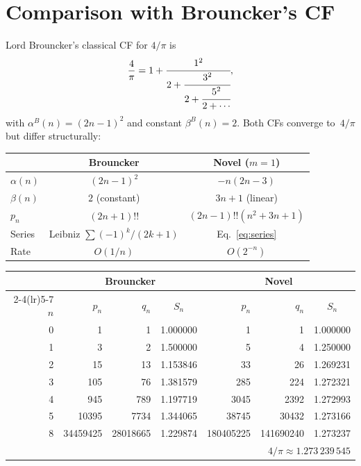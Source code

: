 \documentclass[11pt,a4paper]{article}
\theoremstyle{plain}
\theoremstyle{definition}
\theoremstyle{remark}
\newcommand{\dff}[1]{(#1)!!}
\begin{document}
\section{Comparison with Brouncker's CF}\label{sec:brouncker}

Lord Brouncker's classical CF for $4/\pi$ is
\[
  \frac{4}{\pi}
  = 1 + \cfrac{1^2}{2 + \cfrac{3^2}{2 + \cfrac{5^2}{2 + \cdots}}},
\]
with $\alpha^B(n) = (2n{-}1)^2$ and constant $\beta^B(n) = 2$.
Both CFs converge to~$4/\pi$ but differ structurally:

\begin{center}
\begin{tabular}{@{}lcc@{}}
  \toprule
  & \textbf{Brouncker} & \textbf{Novel ($m{=}1$)} \\
  \midrule
  $\alpha(n)$ & $(2n{-}1)^2$ & $-n(2n{-}3)$ \\
  $\beta(n)$ & $2$ (constant) & $3n{+}1$ (linear) \\
  $p_n$ & $(2n{+}1)!!$ & $\dff{2n{-}1}(n^2{+}3n{+}1)$ \\
  Series & Leibniz $\sum (-1)^k/(2k{+}1)$ &
    Eq.~\eqref{eq:series} \\
  Rate & $O(1/n)$ & $O(2^{-n})$ \\
  \bottomrule
\end{tabular}
\end{center}

\begin{center}
\small
\begin{tabular}{@{}rrrcrrc@{}}
  \toprule
  & \multicolumn{3}{c}{\textbf{Brouncker}} &
    \multicolumn{3}{c}{\textbf{Novel}} \\
  \cmidrule(lr){2-4}\cmidrule(lr){5-7}
  $n$ & $p_n$ & $q_n$ & $S_n$ & $p_n$ & $q_n$ & $S_n$ \\
  \midrule
  0 & 1 & 1 & 1.000000 & 1 & 1 & 1.000000 \\
  1 & 3 & 2 & 1.500000 & 5 & 4 & 1.250000 \\
  2 & 15 & 13 & 1.153846 & 33 & 26 & 1.269231 \\
  3 & 105 & 76 & 1.381579 & 285 & 224 & 1.272321 \\
  4 & 945 & 789 & 1.197719 & 3045 & 2392 & 1.272993 \\
  5 & 10395 & 7734 & 1.344065 & 38745 & 30432 & 1.273166 \\
  8 & 34459425 & 28018665 & 1.229874 &
    180405225 & 141690240 & 1.273237 \\
  \bottomrule
  \multicolumn{7}{r}{$4/\pi \approx 1.273\,239\,545$}
\end{tabular}
\end{center}
\end{document}
